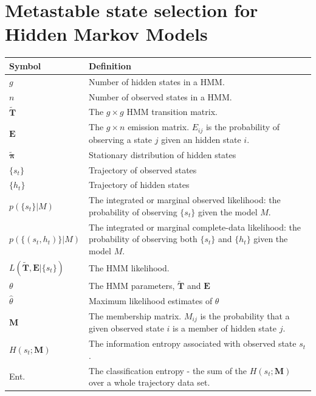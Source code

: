 \let\textcircled=\pgftextcircled
\chapter{Metastable state selection for Hidden Markov Models}
\label{chap:hmm}


\begin{table}
    \centering
    \begin{tabularx}{0.9\textwidth}{ |l| >{\raggedright\arraybackslash}X | } 
    \hline
    \textbf{Symbol}  &  \textbf{Definition} \\
    \hline\hline
    $g$ & Number of hidden states in a HMM. \\
    $n$ & Number of observed states in a HMM. \\
    $\mathbf{\tilde{T}}$ & The $g\times g$ HMM transition matrix. \\
    $\mathbf{E}$ & The $g \times n$ emission matrix. $E_{ij}$ is the probability of observing a state $j$ given an hidden state $i$. \\
    $\tilde{\bm{\pi}}$ & Stationary distribution of hidden states \\
    $\{s_{t}\}$ & Trajectory of observed states \\
    $\{h_{t}\}$ & Trajectory of hidden states \\
    $p(\{s_t\}|M)$ & The integrated or marginal observed likelihood: the probability of observing $\{s_t\}$ given the model $M$. \\
    $p(\{(s_t, h_t)\}|M)$ & The integrated or marginal complete-data likelihood: the probability of observing both $\{s_t\}$ and $\{h_t\}$ given the model $M$.  \\
    $L(\tilde{\mathbf{T}}, \mathbf{E}| \{s_t\})$ & The HMM likelihood. \\
    $\theta$ & The HMM parameters, $\tilde{\mathbf{T}}$ and $\mathbf{E}$\\
    $\hat{\theta}$ & Maximum likelihood estimates of $\theta$ \\
    $\mathbf{M}$ & The membership matrix. $M_{ij}$ is the probability that a given observed state $i$ is a member of hidden state $j$. \\
    $H(s_{t}; \mathbf{M})$ & The information entropy associated with observed state $s_{t}$. \\
    Ent. & The classification entropy - the sum of the $H(s_{t}; \mathbf{M})$ over a whole trajectory data set. \\
    \hline
    \end{tabularx}
    \label{tab:hmm_symbols}
\end{table}

